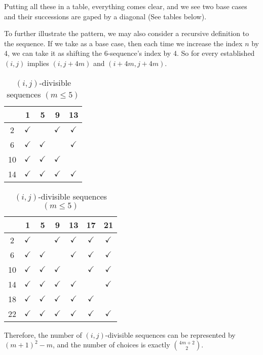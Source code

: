 \begin{solution}
    Putting all these in a table, everything comes clear, and we see two base cases and their successions are gaped by a diagonal (See tables below).

    To further illustrate the pattern, we may also consider a recursive definition to the sequence. If we take  as a base case, then each time we increase the index $n$ by 4, we can take it as shifting the 6-sequence's index by 4. So for every established $(i,j)$ implies $(i,j+4m)$ and $(i+4m, j+4m)$.
    \begin{table}[H]
    \centering
    \begin{minipage}{0.45\linewidth}
        \centering
        \caption{$(i,j)$-divisible sequences $(m\leq3)$}
        \begin{tabular}{|c|c|c|c|c|}
            \hline & 1 & 5 & 9 & 13 \\
            \hline 2 & $\checkmark$ & & $\checkmark$ & $\checkmark$ \\
            \hline 6 & $\checkmark$ & $\checkmark$ & & $\checkmark$ \\
            \hline 10 & $\checkmark$ & $\checkmark$ & $\checkmark$ & \\
            \hline 14 & $\checkmark$ & $\checkmark$ & $\checkmark$ & $\checkmark$ \\
            \hline
        \end{tabular}
    \end{minipage}
    \hfill
    \begin{minipage}{0.45\linewidth}
        \centering
        \caption{$(i,j)$-divisible sequences $(m\leq5)$}
        \begin{tabular}{|c|c|c|c|c|c|c|}
            \hline & 1 & 5 & 9 & 13 & 17 & 21 \\
            \hline 2 & $\checkmark$ & & $\checkmark$ & $\checkmark$ & $\checkmark$ & $\checkmark$ \\
            \hline 6 & $\checkmark$ & $\checkmark$ & & $\checkmark$ & $\checkmark$ & $\checkmark$ \\
            \hline 10 & $\checkmark$ & $\checkmark$ & $\checkmark$ & & $\checkmark$ & $\checkmark$ \\
            \hline 14 & $\checkmark$ & $\checkmark$ & $\checkmark$ & $\checkmark$ & & $\checkmark$ \\
            \hline 18 & $\checkmark$ & $\checkmark$ & $\checkmark$ & $\checkmark$ & $\checkmark$ & \\
            \hline 22 & $\checkmark$ & $\checkmark$ & $\checkmark$ & $\checkmark$ & $\checkmark$ & $\checkmark$ \\
            \hline
        \end{tabular}
    \end{minipage}
\end{table}
    Therefore, the number of $(i,j)$-divisible sequences can be represented by 
    $(m+1)^2-m$, and the number of choices is exactly $\binom{4m+2}{2}$.


\end{solution}
